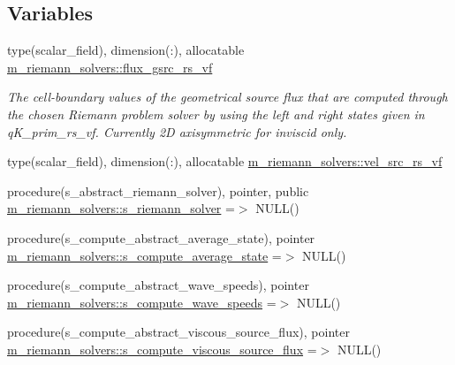 \subsection*{Variables}
\begin{DoxyCompactItemize}
\item 
type(scalar\+\_\+field), dimension(\+:), allocatable \hyperlink{namespacem__riemann__solvers_aa67462b01acb62fbe8730a28aa37b7a9}{m\+\_\+riemann\+\_\+solvers\+::flux\+\_\+gsrc\+\_\+rs\+\_\+vf}
\begin{DoxyCompactList}\small\item\em The cell-\/boundary values of the geometrical source flux that are computed through the chosen Riemann problem solver by using the left and right states given in q\+K\+\_\+prim\+\_\+rs\+\_\+vf. Currently 2D axisymmetric for inviscid only. \end{DoxyCompactList}\item 
type(scalar\+\_\+field), dimension(\+:), allocatable \hyperlink{namespacem__riemann__solvers_aee9f1299db2c29eabb5d2ef096f0abe0}{m\+\_\+riemann\+\_\+solvers\+::vel\+\_\+src\+\_\+rs\+\_\+vf}
\item 
procedure(s\+\_\+abstract\+\_\+riemann\+\_\+solver), pointer, public \hyperlink{namespacem__riemann__solvers_a7edc50538c81447bf49e9242d85ee1ff}{m\+\_\+riemann\+\_\+solvers\+::s\+\_\+riemann\+\_\+solver} =$>$ N\+U\+LL()
\item 
procedure(s\+\_\+compute\+\_\+abstract\+\_\+average\+\_\+state), pointer \hyperlink{namespacem__riemann__solvers_a7bf84258c88a5e2c0accdc130ac812d9}{m\+\_\+riemann\+\_\+solvers\+::s\+\_\+compute\+\_\+average\+\_\+state} =$>$ N\+U\+LL()
\item 
procedure(s\+\_\+compute\+\_\+abstract\+\_\+wave\+\_\+speeds), pointer \hyperlink{namespacem__riemann__solvers_a3e2b4d51fda04b61d6f54069c5bb66c6}{m\+\_\+riemann\+\_\+solvers\+::s\+\_\+compute\+\_\+wave\+\_\+speeds} =$>$ N\+U\+LL()
\item 
procedure(s\+\_\+compute\+\_\+abstract\+\_\+viscous\+\_\+source\+\_\+flux), pointer \hyperlink{namespacem__riemann__solvers_a334d729c58a5c746cb0045d1f5f00b01}{m\+\_\+riemann\+\_\+solvers\+::s\+\_\+compute\+\_\+viscous\+\_\+source\+\_\+flux} =$>$ N\+U\+LL()
\end{DoxyCompactItemize}
\textbf{ }\par
